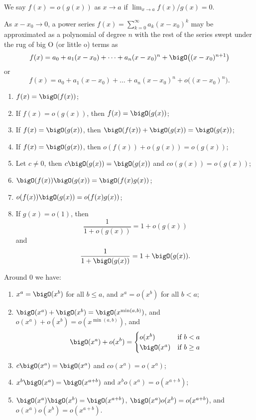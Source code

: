 \begin{node}
\begin{definition}
We say $f(x)=o(g(x))$ as $x\to a$ if $\lim_{x\to a}f(x)/g(x)=0$.
\end{definition}

\begin{example}
As $x-x_{0}\to 0$, a power series $f(x)=\sum^{\infty}_{k=0}a_{k}(x-x_{0})^{k}$
may be approximated as a polynomial of degree $n$ with the rest of the
series swept under the rug of big O (or little o) terms as
\[f(x) = a_{0} + a_{1}(x-x_{0}) + \dots + a_{n}(x-x_{0})^{n} + \bigO\bigl((x-x_{0})^{n+1}\bigr)\]
or
\[f(x) = a_{0} + a_{1}(x-x_{0}) + \dots + a_{n}(x-x_{0})^{n} + o\bigl((x-x_{0})^{n}\bigr).\]
\end{example}

\begin{theorem}\label{calculus-0004}%
\begin{enumerate}
\item $f(x)=\bigO(f(x))$;
\item If $f(x)=o(g(x))$, then $f(x)=\bigO(g(x))$;
\item If $f(x)=\bigO(g(x))$, then $\bigO(f(x))+\bigO(g(x))=\bigO(g(x))$;
\item If $f(x)=\bigO(g(x))$, then $o(f(x))+o(g(x))=o(g(x))$;
\item Let $c\neq0$, then $c\bigO(g(x))=\bigO(g(x))$ and $co(g(x))=o(g(x))$;
\item $\bigO(f(x))\bigO(g(x))=\bigO(f(x)g(x))$;
\item $o(f(x))\bigO(g(x))=o(f(x)g(x))$;
\item If $g(x)=o(1)$, then
  \[\frac{1}{1+o(g(x))}=1+o(g(x))\]
  and
  \[\frac{1}{1+\bigO(g(x))}=1+\bigO(g(x)).\]
\end{enumerate}
\end{theorem}

\begin{theorem}\label{calculus-0003}%
Around $0$ we have:
\begin{enumerate}
\item $x^{a}=\bigO(x^{b})$ for all $b\leq a$, and $x^{a}=o(x^{b})$ for
  all $b<a$;
\item $\bigO(x^{a})+\bigO(x^{b})=\bigO(x^{\min(a,b)})$,
  and $o(x^{a})+o(x^{b})=o(x^{\min(a,b)})$, and
\[\bigO(x^{a})+o(x^{b}) = \begin{cases}o(x^{b}) & \mbox{if }b<a\\
\bigO(x^{a}) & \mbox{if }b\geq a \end{cases}\]
\item $c\bigO(x^{a}) = \bigO(x^{a})$ and $c o(x^{a})=o(x^{a})$;
\item $x^{b}\bigO(x^{a}) = \bigO(x^{a+b})$ and
  $x^{b} o(x^{a})=o(x^{a+b})$;
\item $\bigO(x^{a})\bigO(x^{b}) = \bigO(x^{a+b})$,
  $\bigO(x^{a})o(x^{b}) = o(x^{a+b})$, and
  $o(x^{a})o(x^{b})=o(x^{a+b})$.
\end{enumerate}
\end{theorem}
\end{node}

